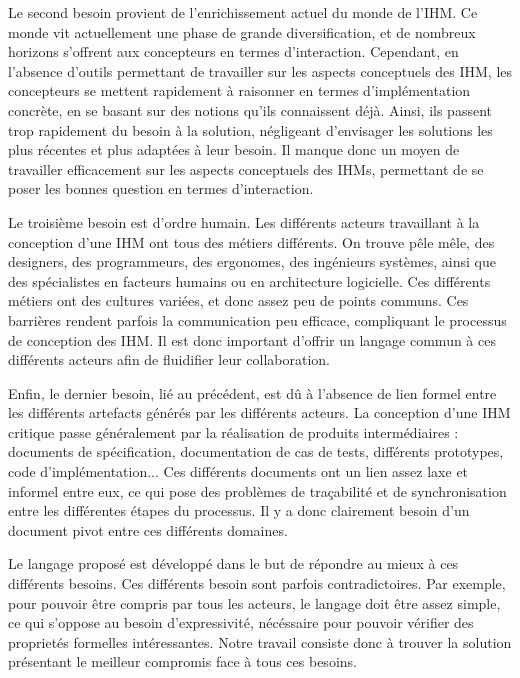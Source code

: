 \documentclass{ihm}
\begin{document}
Le second besoin provient de l'enrichissement actuel du monde de
l'IHM. Ce monde vit actuellement une phase de grande
diversification, et de nombreux horizons s'offrent aux
concepteurs en termes d'interaction. Cependant, en l'absence
d'outils permettant de travailler sur les aspects conceptuels
des IHM, les concepteurs se mettent rapidement à raisonner en
termes d'implémentation concrète, en se basant sur des notions
qu'ils connaissent déjà. Ainsi, ils passent trop rapidement du
besoin à la solution, négligeant d'envisager les solutions les
plus récentes et plus adaptées à leur besoin. Il manque donc un
moyen de travailler efficacement sur les aspects conceptuels des
IHMs, permettant de se poser les bonnes question en termes
d'interaction.

Le troisième besoin est d'ordre humain. Les différents acteurs
travaillant à la conception d'une IHM ont tous des métiers
différents. On trouve pêle mêle, des designers, des
programmeurs, des ergonomes, des ingénieurs systèmes, ainsi que
des spécialistes en facteurs humains ou en architecture
logicielle. Ces différents métiers ont des cultures variées, et
donc assez peu de points communs. Ces barrières rendent parfois
la communication peu efficace, compliquant le processus de
conception des IHM. Il est donc important d'offrir un langage
commun à ces différents acteurs afin de fluidifier leur
collaboration.

Enfin, le dernier besoin, lié au précédent, est dû à l'absence
de lien formel entre les différents artefacts générés par les
différents acteurs. La conception d'une IHM critique passe
généralement par la réalisation de produits intermédiaires :
documents de spécification, documentation de cas de tests,
différents prototypes, code d'implémentation... Ces différents
documents ont un lien assez laxe et informel entre eux, ce qui
pose des problèmes de traçabilité et de synchronisation entre
les différentes étapes du processus. Il y a donc clairement
besoin d'un document pivot entre ces différents domaines.

Le langage proposé est développé dans le but de répondre au
mieux à ces différents besoins. Ces différents besoin sont
parfois contradictoires. Par exemple, pour pouvoir être compris
par tous les acteurs, le langage doit être assez simple, ce qui
s'oppose au besoin d'expressivité, nécéssaire pour pouvoir
vérifier des proprietés formelles intéressantes. Notre travail
consiste donc à trouver la solution présentant le meilleur
compromis face à tous ces besoins.
\end{document}
